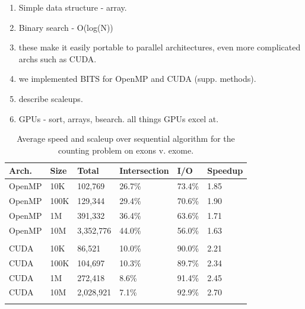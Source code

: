 \documentclass{bioinfo}
\begin{document}
        \begin{enumerate}
                \item Simple data structure - array.
                \item Binary search - O(log(N))
                \item these make it easily portable to parallel architectures, even 
                      more complicated archs such as CUDA.
                \item we implemented BITS for OpenMP and CUDA (supp. methods).
                \item describe scaleups.
                \item GPUs - sort, arrays, bsearch.  all things GPUs excel at.
        \end{enumerate} 
        
        \begin{table}[h]
        \centering
        \begin{center}
                \begin{tabular}{l l l l l l}
                        Arch. & Size & Total & Intersection & I/O & Speedup \\
                        \hline
                        \hline
                        OpenMP & 10K & 102,769 & 26.7\% & 73.4\% & 1.85 \\
                        OpenMP & 100K & 129,344 & 29.4\% & 70.6\% & 1.90 \\
                        OpenMP & 1M & 391,332 & 36.4\% & 63.6\% & 1.71 \\
                        OpenMP & 10M & 3,352,776 & 44.0\% & 56.0\% & 1.63 \\ 
                        \\
                        CUDA & 10K & 86,521 & 10.0\% & 90.0\% & 2.21 \\
                        CUDA & 100K & 104,697 & 10.3\% & 89.7\% & 2.34 \\
                        CUDA & 1M & 272,418 & 8.6\% & 91.4\% & 2.45 \\
                        CUDA & 10M & 2,028,921 & 7.1\% & 92.9\% & 2.70 \\
                        \\
                \end{tabular}
        \end{center}
        \label{table:avge}
        \caption{Average speed and scaleup over sequential algorithm for the counting problem on exons v. exome.}
        \end{table}
        
\end{document}
